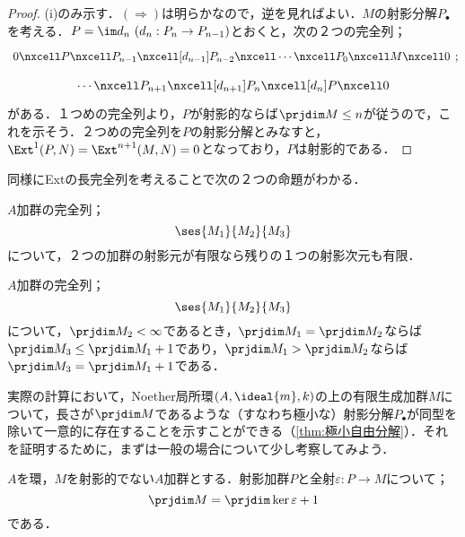 \begin{proof}
	(i)のみ示す．$(\Longrightarrow)$は明らかなので，逆を見ればよい．$M$の射影分解$P_\bullet$を考える．$P=\im d_n~(d_n:P_n\to P_{n-1})$とおくと，次の２つの完全列；
	\[\begin{tikzcd}
	0\nxcell P\nxcell P_{n-1}\nxcell[d_{n-1}]P_{n-2}\nxcell\cdots\nxcell P_0\nxcell M\nxcell0\end{tikzcd};\]
	\[\begin{tikzcd}
	\cdots\nxcell P_{n+1}\nxcell[d_{n+1}]P_n\nxcell[d_n]P\nxcell0
	\end{tikzcd}\]
	がある．１つめの完全列より，$P$が射影的ならば$\prjdim M\leq n$が従うので，これを示そう．２つめの完全列を$P$の射影分解とみなすと，$\Ext^1(P,N)=\Ext^{n+1}(M,N)=0$となっており，$P$は射影的である．
\end{proof}

同様にExtの長完全列を考えることで次の２つの命題がわかる．
\begin{cor}\label{cor:prjdimの有限性}
	$A$加群の完全列；
	\[\ses{M_1}{M_2}{M_3}\]
	について，２つの加群の射影元が有限なら残りの１つの射影次元も有限．
\end{cor}

\begin{cor}\label{cor:prjdim lemma}
	$A$加群の完全列；
	\[\ses{M_1}{M_2}{M_3}\]
	について，$\prjdim M_2<\infty$であるとき，$\prjdim M_1=\prjdim M_2$ならば$\prjdim M_3\leq\prjdim M_1+1$であり，$\prjdim M_1>\prjdim M_2$ならば$\prjdim M_3=\prjdim M_1+1$である．
\end{cor}

実際の計算において，Noether局所環$(A,\ideal{m},k)$の上の有限生成加群$M$について，長さが$\prjdim M$であるような（すなわち極小な）射影分解$P_\bullet$が同型を除いて一意的に存在することを示すことができる（\ref{thm:極小自由分解}）．それを証明するために，まずは一般の場合について少し考察してみよう．

\begin{lem}\label{lem:射影次元ステップアップ}
	$A$を環，$M$を射影的でない$A$加群とする．射影加群$P$と全射$\varepsilon:P\to M$について；
	\[\prjdim M=\prjdim \ker\varepsilon+1\]
	である．
\end{lem}

